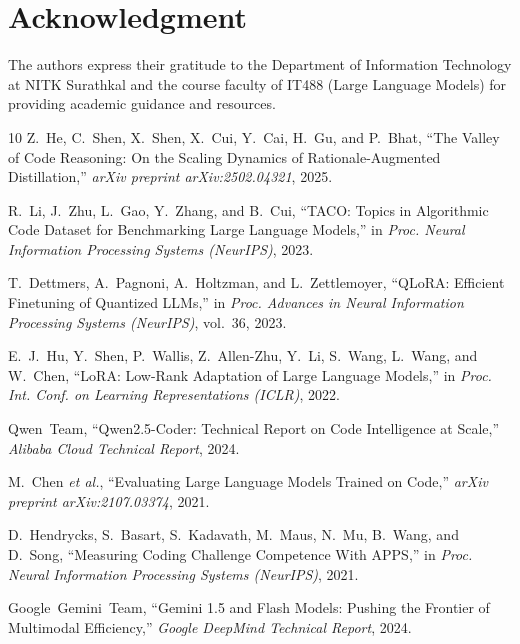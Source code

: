 \documentclass[lettersize,journal]{IEEEtran}
\begin{document}
\section*{Acknowledgment}
The authors express their gratitude to the Department of Information Technology at NITK Surathkal and the course faculty of IT488 (Large Language Models) for providing academic guidance and resources.

\begin{thebibliography}{10}
Z.~He, C.~Shen, X.~Shen, X.~Cui, Y.~Cai, H.~Gu, and P.~Bhat,
``The Valley of Code Reasoning: On the Scaling Dynamics of Rationale-Augmented Distillation,''
\textit{arXiv preprint arXiv:2502.04321}, 2025.

R.~Li, J.~Zhu, L.~Gao, Y.~Zhang, and B.~Cui,
``TACO: Topics in Algorithmic Code Dataset for Benchmarking Large Language Models,''
in \textit{Proc. Neural Information Processing Systems (NeurIPS)}, 2023.

T.~Dettmers, A.~Pagnoni, A.~Holtzman, and L.~Zettlemoyer,
``QLoRA: Efficient Finetuning of Quantized LLMs,''
in \textit{Proc. Advances in Neural Information Processing Systems (NeurIPS)}, vol.~36, 2023.

E.~J.~Hu, Y.~Shen, P.~Wallis, Z.~Allen-Zhu, Y.~Li, S.~Wang, L.~Wang, and W.~Chen,
``LoRA: Low-Rank Adaptation of Large Language Models,''
in \textit{Proc. Int. Conf. on Learning Representations (ICLR)}, 2022.

Qwen~Team,
``Qwen2.5-Coder: Technical Report on Code Intelligence at Scale,''
\textit{Alibaba Cloud Technical Report}, 2024.

M.~Chen \textit{et al.},
``Evaluating Large Language Models Trained on Code,''
\textit{arXiv preprint arXiv:2107.03374}, 2021.

D.~Hendrycks, S.~Basart, S.~Kadavath, M.~Maus, N.~Mu, B.~Wang, and D.~Song,
``Measuring Coding Challenge Competence With APPS,''
in \textit{Proc. Neural Information Processing Systems (NeurIPS)}, 2021.

Google~Gemini~Team,
``Gemini 1.5 and Flash Models: Pushing the Frontier of Multimodal Efficiency,''
\textit{Google DeepMind Technical Report}, 2024.

\end{thebibliography}
\end{document}
